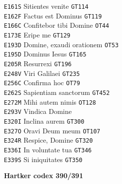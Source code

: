 \documentclass[a4paper]{article}
\begin{document}
{\begin{multicols}{2}
\texttt{E161S} Sitientes venite \texttt{GT114}\\
\texttt{E162F} Factus est Dominus \texttt{GT119}\\
\texttt{E166C} Confitebor tibi Domine \texttt{OT44}\\
\texttt{E173E} Eripe me \texttt{GT129}\\
\texttt{E193D} Domine, exaudi orationem \texttt{OT53}\\
\texttt{E195D} Dominus Iesus \texttt{GT165}\\
\texttt{E205R} Resurrexi \texttt{GT196}\\
\texttt{E248V} Viri Galilaei \texttt{GT235}\\
\texttt{E256C} Confirma hoc \texttt{OT79}\\
\texttt{E262S} Sapientiam sanctorum \texttt{GT452}\\
\texttt{E272M} Mihi autem nimis \texttt{OT128}\\
\texttt{E293V} Vindica Domine\\
\texttt{E320I} Inclina aurem \texttt{GT300}\\
\texttt{E327O} Oravi Deum meum \texttt{OT107}\\
\texttt{E324R} Respice, Domine \texttt{GT320}\\
\texttt{E336I} In voluntate tua \texttt{GT346}\\
\texttt{E339S} Si iniquitates \texttt{GT350}

\noindent\textbf{Hartker codex 390/391}


\end{multicols}}
\end{document}
